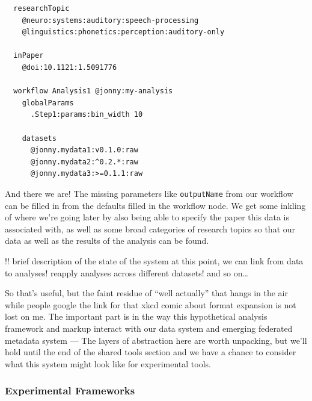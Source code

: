 \documentclass[10pt]{article}
\begin{document}
\begin{multicols}{2}
\begin{verbatim}
  researchTopic
    @neuro:systems:auditory:speech-processing
    @linguistics:phonetics:perception:auditory-only

  inPaper
    @doi:10.1121:1.5091776 

  workflow Analysis1 @jonny:my-analysis
    globalParams
      .Step1:params:bin_width 10

    datasets
      @jonny.mydata1:v0.1.0:raw
      @jonny.mydata2:^0.2.*:raw
      @jonny.mydata3:>=0.1.1:raw
\end{verbatim}

And there we are! The missing parameters like \texttt{outputName} from
our workflow can be filled in from the defaults filled in the workflow
node. We get some inkling of where we're going later by also being able
to specify the paper this data is associated with, as well as some broad
categories of research topics so that our data as well as the results of
the analysis can be found.

!! brief description of the state of the system at this point, we can
link from data to analyses! reapply analyses across different datasets!
and so on\ldots{}

So that's useful, but the faint residue of ``well actually'' that hangs
in the air while people google the link for that xkcd comic about format
expansion is not lost on me. The important part is in the way this
hypothetical analysis framework and markup interact with our data system
and emerging federated metadata system --- The layers of abstraction
here are worth unpacking, but we'll hold until the end of the shared
tools section and we have a chance to consider what this system might
look like for experimental tools.


\end{multicols}


\hypertarget{experimental-frameworks}{%
\subsubsection{Experimental Frameworks}\label{experimental-frameworks}}
\end{document}
